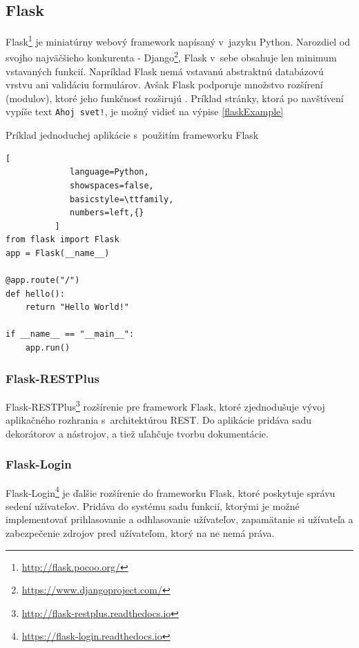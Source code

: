 \documentclass[slovak]{fitthesis}
\begin{document}
\subsection{Flask}\label{flask}
Flask\footnote{\url{http://flask.pocoo.org/}} je miniatúrny webový framework napísaný v~jazyku Python. Narozdiel od svojho najväčšieho konkurenta - Django\footnote{\url{https://www.djangoproject.com/}}, Flask v~sebe obsahuje len minimum vstavaných funkcií. Napríklad Flask nemá vstavanú abstraktnú databázovú vrstvu ani validáciu formulárov. Avšak Flask podporuje množstvo rozšírení (modulov), ktoré jeho funkčnosť rozširujú \cite{grinberg2018flask}. Príklad stránky, ktorá po navštívení vypíše text \texttt{Ahoj svet!}, je možný vidieť na výpise \ref{flaskExample}



\begin{algorithm}[H]
  \caption{Príklad jednoduchej aplikácie s~použitím frameworku Flask}
  \label{flaskExample}
  \begin{lstlisting}[
             language=Python,
             showspaces=false,
             basicstyle=\ttfamily,
             numbers=left,{}
          ]
from flask import Flask
app = Flask(__name__)

@app.route("/")
def hello():
    return "Hello World!"

if __name__ == "__main__":
    app.run()
  \end{lstlisting}
\end{algorithm}

\subsubsection{Flask-RESTPlus}\label{RestPlusFlask}
Flask-RESTPlus\footnote{\url{http://flask-restplus.readthedocs.io}} rozšírenie pre framework Flask, ktoré zjednodušuje vývoj aplikačného rozhrania s~architektúrou REST. Do aplikácie pridáva sadu dekorátorov a nástrojov, a tiež uľahčuje tvorbu dokumentácie.

\subsubsection{Flask-Login}\label{Flask login}
Flask-Login\footnote{\url{https://flask-login.readthedocs.io}} je ďalšie rozšírenie do frameworku Flask, ktoré poskytuje správu sedení užívateľov. Pridáva do systému sadu funkcií, ktorými je možné implementovať prihlasovanie a odhlasovanie užívateľov, zapamätanie si užívateľa a zabezpečenie zdrojov pred užívateľom, ktorý na ne nemá práva.
\end{document}
